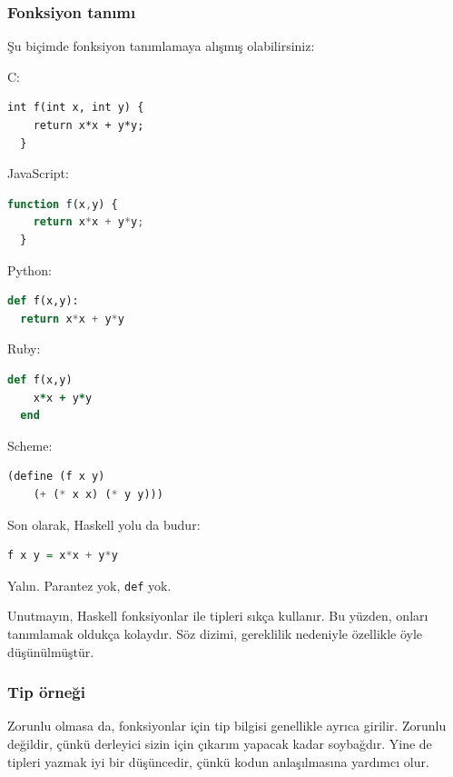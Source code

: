 \documentclass[a4paper,14pt,openany]{extbook} %
\begin{document}
\subsubsection{Fonksiyon tanımı}\label{fonksiyon-tanux131mux131}

Şu biçimde fonksiyon tanımlamaya alışmış olabilirsiniz:

C:

\begin{lstlisting}[language={[ANSI]C},tabsize=2,escapeinside=||]
  int f(int x, int y) {
    return x*x + y*y;
  }
\end{lstlisting}

JavaScript:

\begin{lstlisting}[language=Javascript]
  function f(x,y) {
    return x*x + y*y;
  }
\end{lstlisting}

Python:

\begin{lstlisting}[language=Python]
  def f(x,y):
  return x*x + y*y
\end{lstlisting}

Ruby:

\begin{lstlisting}[language=Ruby]
  def f(x,y)
    x*x + y*y
  end
\end{lstlisting}

Scheme:

\begin{lstlisting}[language=Scheme]
  (define (f x y)
    (+ (* x x) (* y y)))
\end{lstlisting}

Son olarak, Haskell yolu da budur:

\begin{lstlisting}[language=Haskell]
  f x y = x*x + y*y
\end{lstlisting}

Yalın. Parantez yok, \lstinline!def! yok.

Unutmayın, Haskell fonksiyonlar ile tipleri sıkça kullanır. Bu yüzden,
onları tanımlamak oldukça kolaydır. Söz dizimi, gereklilik nedeniyle
özellikle öyle düşünülmüştür.

\subsubsection{Tip örneği}\label{tip-uxf6rneux11fi}

Zorunlu olmasa da, %
fonksiyonlar için tip bilgisi genellikle
ayrıca girilir. Zorunlu değildir, çünkü derleyici sizin için çıkarım
yapacak kadar soybağdır.
Yine de tipleri yazmak iyi bir düşüncedir, çünkü
kodun anlaşılmasına yardımcı olur.
\end{document}
